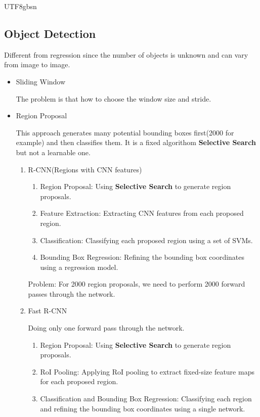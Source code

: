 \documentclass{article}
\numberwithin{equation}{section}
\begin{document}
\begin{CJK}{UTF8}{gbsn}
\subsection{Object Detection}
Different from regression since the number of objects is unknown and can vary from image to image.\par
\begin{itemize}
    \item Sliding Window\par
    The problem is that how to choose the window size and stride.
    \item Region Proposal\par
    This approach generates many potential bounding boxes first(2000 for example) and then classifies them.
    It is a fixed algorithom \textbf{Selective Search} but not a learnable one.\par
    \begin{enumerate}
        \item R-CNN(Regions with CNN features)
        \begin{enumerate}
            \item Region Proposal: Using \textbf{Selective Search} to generate region proposals.
            \item Feature Extraction: Extracting CNN features from each proposed region.
            \item Classification: Classifying each proposed region using a set of SVMs.
            \item Bounding Box Regression: Refining the bounding box coordinates using a regression model.
        \end{enumerate}
        Problem: For 2000 region proposals, we need to perform 2000 forward passes through the network.\par
        \item Fast R-CNN\par
        Doing only one forward pass through the network.\par
        \begin{enumerate}
            \item Region Proposal: Using \textbf{Selective Search} to generate region proposals.
            \item RoI Pooling: Applying RoI pooling to extract fixed-size feature maps for each proposed region.
            \item Classification and Bounding Box Regression: Classifying each region and refining the bounding box coordinates using a single network.

\end{enumerate}
\end{enumerate}
\end{itemize}
\end{CJK}
\end{document}
